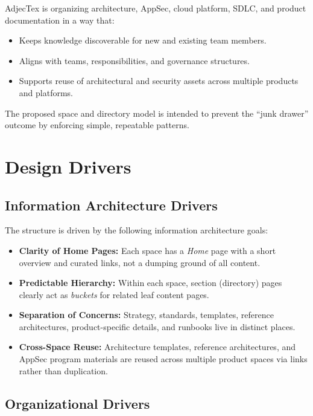 \documentclass[11pt]{article}
\begin{document}
AdjecTex is organizing architecture, AppSec, cloud platform, SDLC,
and product documentation in a way that:

\begin{itemize}[leftmargin=*]
  \item Keeps knowledge discoverable for new and existing team
        members.
  \item Aligns with teams, responsibilities, and governance
        structures.
  \item Supports reuse of architectural and security assets across
        multiple products and platforms.
\end{itemize}

The proposed space and directory model is intended to prevent the
``junk drawer'' outcome by enforcing simple, repeatable patterns.

\section{Design Drivers}

\subsection{Information Architecture Drivers}

The structure is driven by the following information architecture
goals:

\begin{itemize}[leftmargin=*]
  \item \textbf{Clarity of Home Pages:}
        Each space has a \emph{Home} page with a short overview and
        curated links, not a dumping ground of all content.
  \item \textbf{Predictable Hierarchy:}
        Within each space, section (directory) pages clearly act as
        \emph{buckets} for related leaf content pages.
  \item \textbf{Separation of Concerns:}
        Strategy, standards, templates, reference architectures,
        product-specific details, and runbooks live in distinct
        places.
  \item \textbf{Cross-Space Reuse:}
        Architecture templates, reference architectures, and
        AppSec program materials are reused across multiple product
        spaces via links rather than duplication.
\end{itemize}

\subsection{Organizational Drivers}
\end{document}
